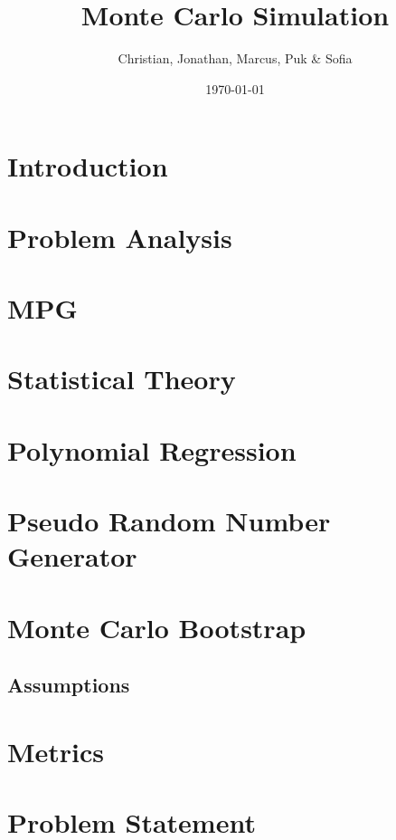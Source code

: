 \documentclass{article}
\title{Monte Carlo Simulation}
\author{Christian, Jonathan, Marcus, Puk \& Sofia }
\date{\today}
\begin{document}
	
	
	\setcounter{section}{0}
	\maketitle
	\newpage
	\tableofcontents
	\newpage
	
	\section{Introduction}
	
	\newpage
	
	\section{Problem Analysis}
	
	\newpage
	
	\section{MPG}
	
	\newpage
	
	\section{Statistical Theory}
	
	\newpage
	
	\section{Polynomial Regression}
 	
	\newpage
	
	
	\section{Pseudo Random Number Generator}
	
	\newpage
	
	\section{Monte Carlo Bootstrap}
	\subsection{Assumptions}
	\newpage
	\section{Metrics}
	
	\newpage

	
	\section{Problem Statement}
	
	\newpage
%	
\end{document}
